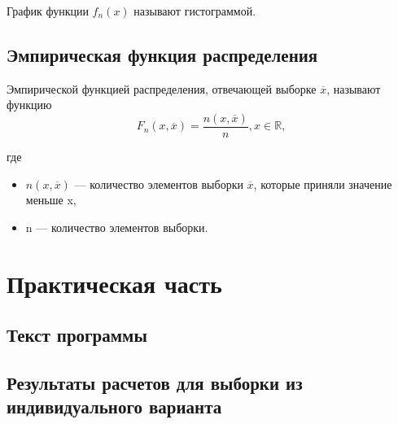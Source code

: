 \documentclass[a4paper, 14pt, unknownkeysallowed]{extreport}
\begin{document}
\begin{definition}
	График функции $f_{n}(x)$ называют гистограммой.
\end{definition}

\section{Эмпирическая функция распределения}
\begin{definition}
	Эмпирической функцией распределения, отвечающей выборке $\overline{x}$, называют функцию\\
	\begin{equation}
	F_n(x, \overline{x}) = \frac{n(x,\overline{x})}{n}, x\in\mathbb{R},
	\end{equation}
\end{definition}
	где
	\begin{itemize}
	\item $n(x,\overline{x})$ --- количество элементов выборки $\overline{x}$, которые приняли значение меньше x,
	\item n --- количество элементов выборки.
	\end{itemize}

\chapter{Практическая часть}
\section{Текст программы}


\clearpage
\section{Результаты расчетов для выборки из индивидуального варианта}
\end{document}
